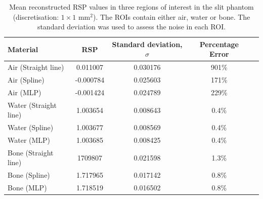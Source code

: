 \documentclass[11pt,a4paper]{article}
\begin{document}
\begin{table}[!htb]
\centering
\caption{Mean reconstructed RSP values in three regions of interest in the slit phantom (discretisation: $1 \times 1$ mm$^2$). The ROIs contain either air, water or bone. The standard deviation was used to assess the noise in each ROI.}
\begin{tabular}{l|cccc}
\hline
Material & RSP & Standard deviation, $\sigma$ & Percentage Error  \\ \hline
Air (Straight line) & 0.011007 & 0.030176 & 901\% \\
Air (Spline) & -0.000784 & 0.025603 & 171\%\\
Air (MLP) & -0.001424  & 0.024789 & 229\%\\

Water (Straight line) & 1.003654 & 0.008643 & 0.4\%\\
Water (Spline) & 1.003677 & 0.008569 & 0.4\%\\
Water (MLP) & 1.003685 & 0.008425 & 0.4\%\\

Bone (Straight line) & 1709807 & 0.021598 & 1.3\% \\ 
Bone (Spline) & 1.717965 & 0.017142 & 0.8\%\\ 
Bone (MLP) & 1.718519 & 0.016502 & 0.8\%\\ 
\end{tabular} 
\label{table:slitVals}
\end{table}


%
%
\end{document}
